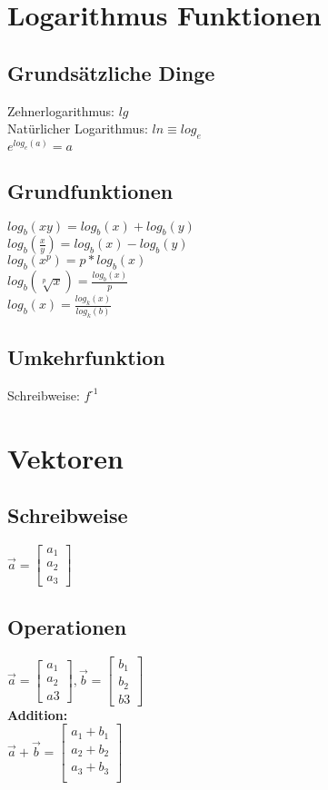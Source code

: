 \documentclass{article}
\newcommand{\inv}{^{\text{-}1}}
\begin{document}
	\begin{multicols}{3}
		\section{Logarithmus Funktionen}
		\subsection{Grundsätzliche Dinge}
		Zehnerlogarithmus: \(lg\)\\
		Natürlicher Logarithmus: \(ln \equiv log_e \)\\
		\(e^{log_{e}(a)} = a \)\\
		\subsection{Grundfunktionen}
		\(log_b(xy) = log_b(x) + log_b(y)\)\\
		\(log_b(\frac{x}{y}) = log_b(x) - log_b(y)\)\\
		\(log_b(x^p) = p * log_b(x) \)\\
		\(log_b(\sqrt[p]{x}) = \frac{log_b(x)}{p} \)\\
		\(log_b(x) = \frac{log_k(x)}{log_k(b)} \)
	
		\subsection{Umkehrfunktion}
		Schreibweise: \(f\inv \) 
		
		\section{Vektoren}
		\subsection{Schreibweise}
		\(\vec{a} = \begin{bmatrix}
		a_1\\a_2\\a_3\end{bmatrix} \)
		\subsection{Operationen}
		\(\vec{a} = \begin{bmatrix}a_1\\a_2\\a3\end{bmatrix},
		\vec{b} = \begin{bmatrix}b_1\\b_2\\b3\end{bmatrix}\)\\
		\textbf{Addition:}\\
		\(\vec{a} + \vec{b} = \begin{bmatrix}
		a_1 + b_1\\a_2 + b_2\\a_3 + b_3\\
		\end{bmatrix} \)	
	\end{multicols}
	
	
\end{document}
